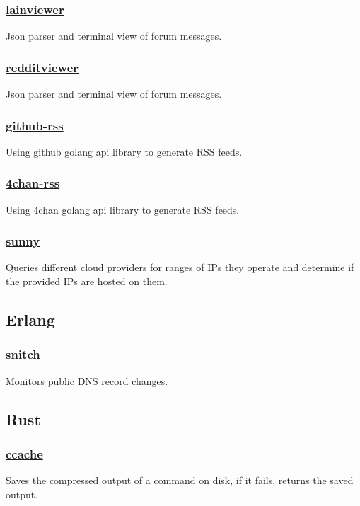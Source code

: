 \documentclass[11pt]{article}
\begin{document}
\subsubsection{\href {https://github.com/azimut/lainviewer} {lainviewer}}
Json parser and terminal view of forum messages.
\subsubsection{\href {https://github.com/azimut/redditviewer} {redditviewer}}
Json parser and terminal view of forum messages.
\subsubsection{\href {https://github.com/azimut/github-rss} {github-rss}}
Using github golang api library to generate RSS feeds.
\subsubsection{\href {https://github.com/azimut/4chan-rss} {4chan-rss}}
Using 4chan golang api library to generate RSS feeds.
\subsubsection{\href {https://github.com/azimut/sunny} {sunny}}
Queries different cloud providers for ranges of IPs they operate and determine if the provided IPs are hosted on them.

\subsection{Erlang}
\subsubsection{\href {https://github.com/azimut/snitch} {snitch}}
Monitors public DNS record changes.

\subsection{Rust}
\subsubsection{\href {https://github.com/azimut/ccache} {ccache}}
Saves the compressed output of a command on disk, if it fails, returns the saved output.
\end{document}
